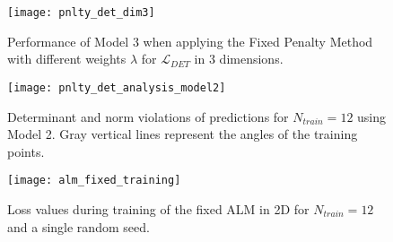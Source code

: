 \begin{figure}[H]
	\centering
	\texttt{[image: pnlty\_det\_dim3]}
	\caption{Performance of Model 3 when applying the Fixed Penalty Method with different weights $\lambda$ for $\mathcal{L}_{DET}$ in 3 dimensions.}
	\label{fig:pnlty_det_dim3}
\end{figure}

\begin{figure}[H]
	\centering
	\texttt{[image: pnlty\_det\_analysis\_model2]}
	\caption{Determinant and norm violations of predictions for $N_{train} = 12$ using Model 2. Gray vertical lines represent the angles of the training points.}
	\label{fig:pnlty_det_analysis_model2}
\end{figure}

\begin{figure}[H]
\centering
\texttt{[image: alm\_fixed\_training]}
\caption{Loss values during training of the fixed ALM in 2D for $N_{train} = 12$ and a single random seed.}
\label{fig:alm_fixed_training}
\end{figure}

\begin{table}[H]
\centering
{}
\caption{Test MSE Loss statistics for 10 random training sets and $N_{train} = 10$}
\label{table_stats_10}
\end{table}

